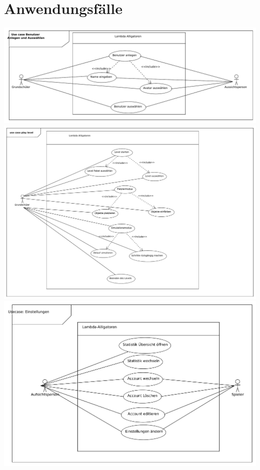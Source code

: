 \section{Anwendungsfälle}
\clearpage
\includegraphics[scale=0.6]{Systemmodelle/add_use_case.pdf}
\clearpage
\includegraphics[scale=0.6]{Systemmodelle/level_use_case.pdf}
\clearpage
\includegraphics[scale=0.6]{Systemmodelle/settings_use_case.pdf}
